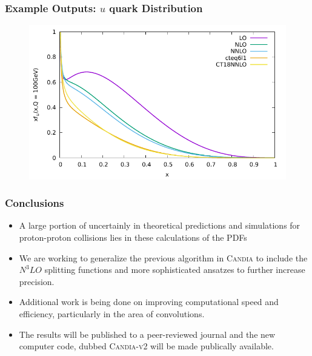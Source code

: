 \documentclass{beamer}
\begin{document}
\begin{frame}
  \frametitle{Example Outputs: $u$ quark Distribution}

  \begin{figure}
    \centering
    \includegraphics[width=0.75\linewidth]{./gfx/u.pdf}
  \end{figure}
\end{frame}



\begin{frame}
  \frametitle{Conclusions}

  \begin{itemize}
  \item A large portion of uncertainly in theoretical predictions and simulations for proton-proton collisions lies in these calculations of the PDFs
  \item We are working to generalize the previous algorithm in \textsc{Candia} to include the $N^3LO$ splitting functions and more sophisticated ansatzes to further increase precision.
  \item Additional work is being done on improving computational speed and efficiency, particularly in the area of convolutions.
  \item The results will be published to a peer-reviewed journal and the new computer code, dubbed \textsc{Candia-v2} will be made publically available.
  \end{itemize}
\end{frame}
\end{document}

